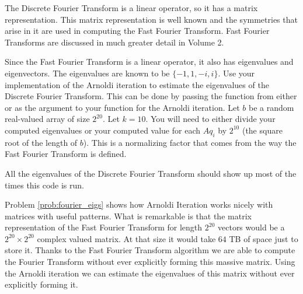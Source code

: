 \begin{problem}
\label{prob:fourier_eigs}
The Discrete Fourier Transform is a linear operator, so it has a matrix representation.
This matrix representation is well known and the symmetries that arise in it are used in computing the Fast Fourier Transform.
Fast Fourier Transforms are discussed in much greater detail in Volume 2.

Since the Fast Fourier Transform is a linear operator, it also has eigenvalues and eigenvectors.
The eigenvalues are known to be $\{ -1, 1, -i, i \}$.
Use your implementation of the Arnoldi iteration to estimate the eigenvalues of the Discrete Fourier Transform.
This can be done by passing the  function from either  or  as the argument  to your function for the Arnoldi iteration.
Let $b$ be a random real-valued array of size $2^{20}$.
Let $k = 10$.
You will need to either divide your computed eigenvalues or your computed value for each $A q_i$ by $2^{10}$ (the square root of the length of $b$).
This is a normalizing factor that comes from the way the Fast Fourier Transform is defined.

All the eigenvalues of the Discrete Fourier Transform should show up most of the times this code is run.
\end{problem}

Problem \ref{prob:fourier_eigs} shows how Arnoldi Iteration works nicely with matrices with useful patterns.
What is remarkable is that the matrix representation of the Fast Fourier Transform for length $2^20$ vectors would be a $2^20 \times 2^20$ complex valued matrix.
At that size it would take $64$ TB of space just to store it.
Thanks to the Fast Fourier Transform algorithm we are able to compute the Fourier Transform without ever explicitly forming this massive matrix.
Using the Arnoldi iteration we can estimate the eigenvalues of this matrix without ever explicitly forming it.


